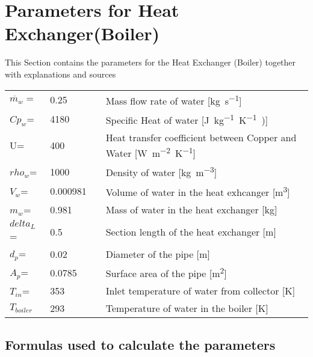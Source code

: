 \section{Parameters for Heat Exchanger(Boiler)} 

This Section contains the parameters for the Heat Exchanger (Boiler) together with explanations and sources 

\begin{tabular}{ l l |c| l} 
	$ \dot{m_{w}}=$		&0.25       &                                          &Mass flow rate of water [\si{kg.s^{-1}}]\\     	
	$ Cp_{w} $=	           	&4180	    &\cite{SpecificHeat}	                   &Specific Heat of water [\si{J.kg^{-1}.K^{-1})}]\\     
	U=		            &400	    &\cite{HeatTransferCoefficient}	           &Heat transfer coefficient between Copper and Water [\si{W.m^{-2}.K^{-1}}] \\
	$ rho_{w} $=	     	&1000	    &\cite{WaterDensity}	                   &Density of water [\si{kg.m^{-3}}] \\
	$ V_{w} $=		        &0.000981	&                                          &Volume of water in the heat exhcanger [\si{m^{3}}]  \\
	$ m_{w} $=	          	&0.981		&                                          &Mass of water in the heat exchanger [\si{kg}]  \\
	$ delta_L $=	    	&0.5		&                                          &Section length of the heat exchanger [\si{m}]  \\
	$ d_{p} $=		        &0.02		&                                          &Diameter of the pipe [\si{m}]  \\
	$ A_{p} $=	         	&0.0785		&                                          &Surface area of the pipe [\si{m^{2}}]  \\
	$ T_{in} $=		        &353	    &                                          &Inlet temperature of water from collector [\si{K}]  \\
	$ T_{boiler} $          &293        &                                          &Temperature of water in the boiler [\si{K}] \\		
\end{tabular}

\subsection{Formulas used to calculate the parameters}

